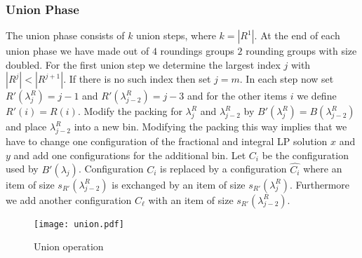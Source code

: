 \documentclass[a4paper,11pt]{article}
\begin{document}
\subsubsection*{Union Phase}
The union phase consists of $k$ union steps, where $k= |R^1|$. At the end of each union phase we have made
out of $4$ roundings groups $2$ rounding groups with size doubled.
For the first union step we determine the largest index $j$ with $|R^j| < |R^{j+1}|$. If there is no such index then
set $j=m$. In each step now set $R'(\lambda_{j}^R) = j-1$ and $R'(\lambda_{j-2}^R) = j-3$ and for the other items $i$
we define $R'(i) = R(i)$. Modify the packing for $\lambda_{j}^R$ and $\lambda_{j-2}^R$ by $B'(\lambda_{j}^R) = 
B(\lambda_{j-2}^R)$ and
place $\lambda_{j-2}^R$ into a new bin. Modifying the packing this way implies that we have to change one configuration
of the fractional and integral LP solution $x$ and $y$ and add one configurations for the additional bin. 
Let $C_i$ be the
configuration used by $B'(\lambda_j)$. Configuration $C_i$ is replaced by a configuration $\hat{C_i}$ where an item
of size $s_{R'}(\lambda_{j-2}^R)$ is exchanged by an item of size $s_{R'}(\lambda_{j}^R)$. Furthermore we add another 
configuration $C_{\ell}$ with an item of size $s_{R'}(\lambda_{j-2}^R)$.
\begin{figure}
\texttt{[image: union.pdf]}
\caption{Union operation}
\end{figure}
\end{document}
